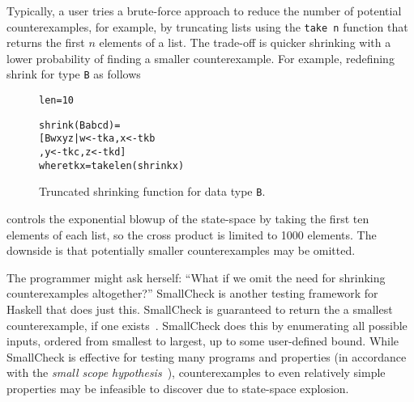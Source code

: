 \documentclass[10pt]{sigplanconf}
\newenvironment{code}{\begin{alltt}}{\end{alltt}}
\newcommand{\ttp}[1]{\texttt{#1}}
\begin{document}
Typically, a user tries a brute-force approach to reduce the number of potential
counterexamples, for example, by truncating lists using the \ttp{take n} function
that returns the first $n$ elements of a list.  The trade-off is quicker
shrinking with a lower probability of finding a smaller counterexample.  For
example, redefining shrink for type \ttp{B} as follows
%


\begin{figure}[ht]
\begin{code}
len = 10

shrink (B a b c d) = 
  [ B w x y z | w <- tk a, x <- tk b
              , y <- tk c, z <- tk d ]
  where tk x = take len (shrink x)
\end{code}
  \caption{Truncated shrinking function for data type \ttp{B}.}
  \label{lst:newshrink}
\end{figure}

%
\noindent
controls the exponential blowup of the state-space by taking the first ten
elements of each list, so the cross product is limited to 1000 elements.  The
downside is that potentially smaller counterexamples may be omitted.

The programmer might ask herself: ``What if we omit the need for shrinking
counterexamples altogether?''  SmallCheck is another testing framework for
Haskell that does just this.  SmallCheck is guaranteed to return the a smallest
counterexample, if one exists~\cite{sc}.  SmallCheck does this by enumerating
all possible inputs, ordered from smallest to largest, up to some user-defined
bound.  While SmallCheck is effective for testing many programs and properties
(in accordance with the \emph{small scope hypothesis}~\cite{jackson}),
counterexamples to even relatively simple properties may be infeasible to
discover due to state-space explosion.
\end{document}
